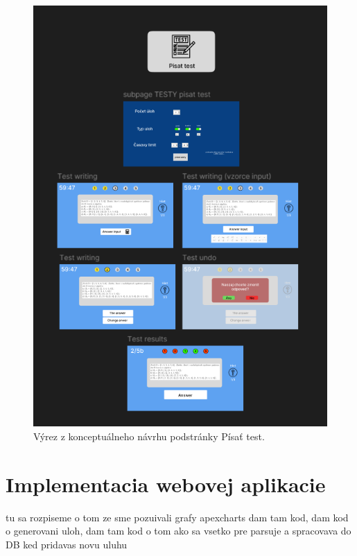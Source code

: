\begin{figure}[htbp]
  \centering
  \includegraphics[width=16cm]{img/figma_screen.png}
  \caption{Výrez z konceptuálneho návrhu podstránky Písať test.}
  \label{figmavizual}
\end{figure} 




 \section{Implementacia webovej aplikacie}
 tu sa rozpiseme o tom ze sme pozuivali grafy apexcharts dam tam kod, dam kod o generovani uloh, dam tam kod o tom ako sa vsetko pre parsuje a spracovava do DB ked pridavas novu uluhu 